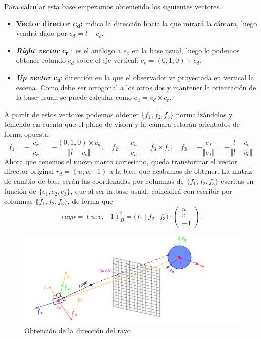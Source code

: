 Para calcular esta base empezamos obteniendo los siguientes vectores.
\begin{itemize}
    \item \textbf{Vector director $\boldsymbol{c_d}$:} indica la dirección hacia la que mirará la cámara, luego vendrá dado por $c_d = l-c_o$.
    \item \textbf{\textit{Right vector} $\boldsymbol{c_r}$ }: es el análogo a $e_x$ en la base usual, luego lo podemos obtener rotando $c_d$ sobre el eje vertical: $c_r = (0,1,0)\times c_d$.
    \item \textbf{\textit{Up vector} $\boldsymbol{c_u}$}: dirección en la que el observador ve proyectada en vertical la escena. Como debe ser ortogonal a los otros dos y mantener la orientación de la base usual, se puede calcular como $c_u = c_d\times c_r$.
\end{itemize}
A partir de estos vectores podemos obtener $\{f_1,f_2,f_3\}$ normalizándolos y teniendo en cuenta que el plano de visión y la cámara estarán orientados de forma opuesta:
\begin{equation*}
    f_1 = -\frac{c_r}{\Vert c_r\Vert} = -\frac{(0,1,0)\times c_d}{\Vert l-c_o\Vert},\quad 
    f_2 = \frac{c_u}{\Vert c_u\Vert } = f_3\times f_1, \quad
    f_3 = -\frac{c_d}{\Vert c_d\Vert} = -\frac{l-c_o}{\Vert l-c_o\Vert}. 
\end{equation*}
Ahora que tenemos el nuevo marco cartesiano, queda transformar el vector director original $r_d = (u,v,-1)$ a la base que acabamos de obtener. La matriz de cambio de base serán las coordenadas por columnas de $\{f_1,f_2,f_3\}$ escritas en función de $\{e_1,e_2,e_3\}$, que al ser la base usual, coincidirá con escribir por columnas $\{f_1,f_2,f_3\}$, de forma que
\begin{equation*}\label{eq:rayo}
    rayo = (u,v,-1)_{B}^t = \big(f_1\ \vert\  f_2\  \vert\  f_3\big) \cdot \begin{pmatrix}
        u\\
        v\\
        -1
    \end{pmatrix}.
\end{equation*}

\begin{figure}[ht!]
    \centering
    \includegraphics[width=\textwidth]{Plantilla-TFG-master/img/raydir_fix.png}
    \caption{Obtención de la dirección del rayo}
    \label{fig:raydir}
\end{figure}

